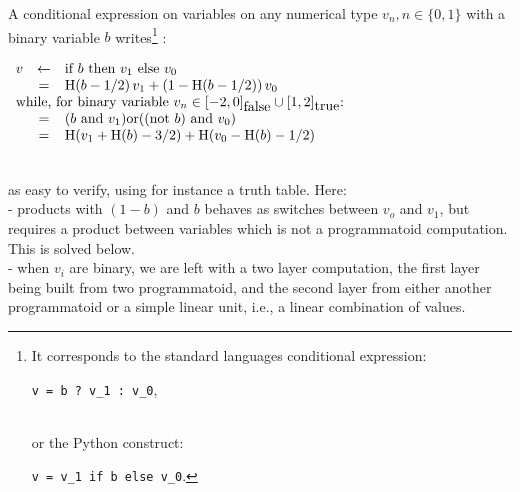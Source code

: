 \documentclass[a4]{article} \usepackage[left=2cm,right=3cm,top=1cm,bottom=2cm]{geometry}
\newcommand{\eqline}[1]{~\vspace{0.1cm}\\\centerline{$#1$}\vspace{0.1cm}\\}
\begin{document}
A conditional expression on variables on any numerical type $v_n, n \in \{0, 1\}$  with a binary variable $b$ writes\footnote{It corresponds to the standard languages conditional expression: \\\centerline{{\tt v = b ? v\_1 : v\_0},}\\ or the Python construct: \\\centerline{{\tt v = v\_1 if b else v\_0}.}} : \eqline{\begin{array}{rcl}
     v &\leftarrow& \mbox{if } b \mbox{ then } v_1 \mbox{ else } v_0 \\
    &=& \mbox{H}(b -1/2) \, v_1 + (1 - \mbox{H}(b -1/2)) \, v_0 \\
    \multicolumn{3}{l}{\mbox{while, for binary variable $v_n \in [-2, 0]_{\mbox{false}} \cup [1, 2]_{\mbox{true}}$: }} \\
    &=& (b \mbox{ and } v_1) \mbox{or} ((\mbox{not } b) \mbox{ and } v_0) \\
    &=& \mbox{H}(v_1 + \mbox{H}(b) - 3/2) + \mbox{H}(v_0 - \mbox{H}(b) - 1/2) \\
\end{array}}
as easy to verify, using for instance a truth table. Here:
\\- products with $(1 - b)$ and $b$ behaves as switches between $v_o$ and $v_1$, but requires a product between variables which is not a programmatoid computation. This is solved below.
\\ - when $v_i$ are binary, we are left with a two layer computation, the first layer being built from two programmatoid,
and the second layer from either another programmatoid or a simple linear unit, i.e., a linear combination of values.
        
\end{document}
